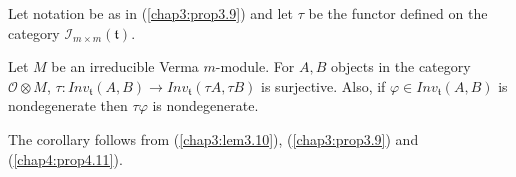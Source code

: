 Let notation be as in (\ref{chap3:prop3.9}) and let $\tau$ be the
functor defined on the category $\mathscr{I}_{m\times m}
(\mathfrak{t})$. 

\begin{coro}\label{chap4:coro4.12}
Let $M$ be an irreducible Verma $m$-module. For $A,B$ objects in the
category $\mathscr{O} \otimes M$, $\tau: Inv_\mathfrak{t} (A,B) \to
Inv_\mathfrak{t}(\tau A, \tau B)$ is surjective. Also, if $\varphi \in
Inv_\mathfrak{t}(A,B)$ is nondegenerate then $\tau \varphi$ is nondegenerate.
\end{coro}

The corollary follows from (\ref{chap3:lem3.10}),
(\ref{chap3:prop3.9}) and (\ref{chap4:prop4.11}). 
